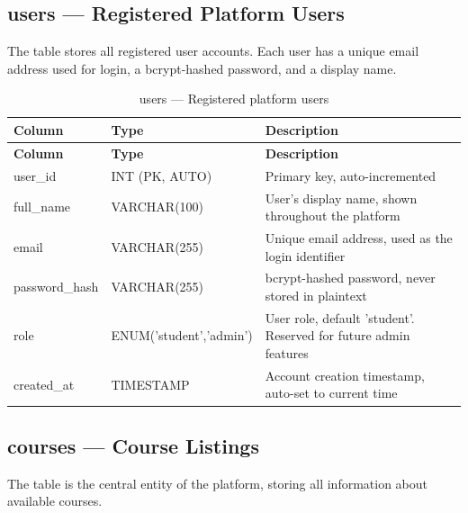 \documentclass[12pt,a4paper]{report}
\begin{document}
\subsection{users — Registered Platform Users}

The  table stores all registered user accounts. Each user has a unique email address used for login, a bcrypt-hashed password, and a display name.

\begin{longtable}{|p{3.5cm}|p{3cm}|p{7cm}|}
    \caption{users — Registered platform users}
    \label{tab:users} \\
    \toprule
    \textbf{Column} & \textbf{Type} & \textbf{Description} \\
    \midrule
    \endfirsthead
    \toprule
    \textbf{Column} & \textbf{Type} & \textbf{Description} \\
    \midrule
    \endhead
    user\_id & INT (PK, AUTO) & Primary key, auto-incremented \\
    full\_name & VARCHAR(100) & User's display name, shown throughout the platform \\
    email & VARCHAR(255) & Unique email address, used as the login identifier \\
    password\_hash & VARCHAR(255) & bcrypt-hashed password, never stored in plaintext \\
    role & ENUM('student','admin') & User role, default 'student'. Reserved for future admin features \\
    created\_at & TIMESTAMP & Account creation timestamp, auto-set to current time \\
    \bottomrule
\end{longtable}

\subsection{courses — Course Listings}

The  table is the central entity of the platform, storing all information about available courses.
\end{document}
